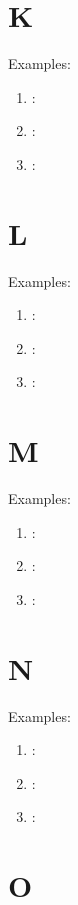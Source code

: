 \section*{K}

Examples:
\begin{enumerate}
    \item \textbf{}: \textipa{[]}
    \item \textbf{}: \textipa{[]}
    \item \textbf{}: \textipa{[]}
\end{enumerate}

\section*{L}

Examples:
\begin{enumerate}
    \item \textbf{}: \textipa{[]}
    \item \textbf{}: \textipa{[]}
    \item \textbf{}: \textipa{[]}
\end{enumerate}

\section*{M}

Examples:
\begin{enumerate}
    \item \textbf{}: \textipa{[]}
    \item \textbf{}: \textipa{[]}
    \item \textbf{}: \textipa{[]}
\end{enumerate}

\section*{N}

Examples:
\begin{enumerate}
    \item \textbf{}: \textipa{[]}
    \item \textbf{}: \textipa{[]}
    \item \textbf{}: \textipa{[]}
\end{enumerate}

\section*{O}

